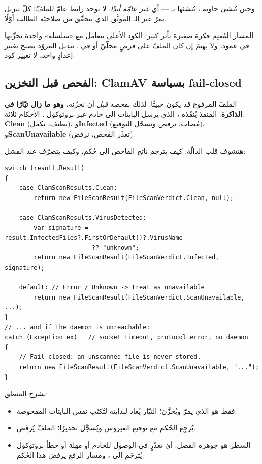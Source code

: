 وحين نُنشئ حاوية ، نُنشئها بـ  — أي \emph{غير
عامّة أبدًا}. لا يوجد رابط عامّ للملفّ؛ كلّ تنزيل يمرّ عبر الـ  الموثَّق الذي
يتحقّق من صلاحيّة الطالب أوّلًا.

\begin{note}
المسار المُعتِم فكرة صغيرة بأثر كبير: الكود الأعلى يتعامل مع «سلسلة» واحدة يخزّنها في
عمود، ولا يهتمّ إن كان الملفّ على قرصٍ محلّيّ أو في . تبديل المزوّد يصبح
تغيير إعدادٍ واحد، لا تغيير كود.
\end{note}

\subsection{الفحص قبل التخزين: ClamAV بسياسة fail-closed}

الملفّ المرفوع قد يكون خبيثًا. لذلك نفحصه \emph{قبل} أن نخزّنه، \textbf{وهو ما زال
تيّارًا في الذاكرة}. المنفذ  يُنفّذه ،
الذي يرسل البايتات إلى خادم  عبر بروتوكول . الأحكام ثلاثة:
\textbf{Clean} (نظيف، نكمل)، و\textbf{Infected} (مُصاب، نرفض ونسجّل التوقيع)،
و\textbf{ScanUnavailable} (تعذّر الفحص، نرفض).

هنشوف قلب الدالّة: كيف يترجم ناتج الفاحص إلى حُكم، وكيف يتصرّف عند الفشل:

\begin{english}
\begin{lstlisting}[language={[Sharp]C}]
switch (result.Result)
{
    case ClamScanResults.Clean:
        return new FileScanResult(FileScanVerdict.Clean, null);

    case ClamScanResults.VirusDetected:
        var signature = result.InfectedFiles?.FirstOrDefault()?.VirusName
                        ?? "unknown";
        return new FileScanResult(FileScanVerdict.Infected, signature);

    default: // Error / Unknown -> treat as unavailable
        return new FileScanResult(FileScanVerdict.ScanUnavailable, ...);
}
// ... and if the daemon is unreachable:
catch (Exception ex)   // socket timeout, protocol error, no daemon
{
    // Fail closed: an unscanned file is never stored.
    return new FileScanResult(FileScanVerdict.ScanUnavailable, "...");
}
\end{lstlisting}
\end{english}

نشرح المنطق:
\begin{itemize}
\item {} فقط هو الذي يمرّ ويُخزَّن؛ التيّار يُعاد لبدايته لتُكتَب نفس
  البايتات المفحوصة.
\item {} يُرجِع الحُكم  مع توقيع الفيروس ويُسجَّل
  تحذيرًا؛ الملفّ يُرفَض.
\item السطر  هو جوهرة الفصل: أيّ تعذّرٍ في الوصول للخادم
  أو مهلة أو خطأ بروتوكول يُترجَم إلى ، ومسار الرفع يرفض هذا
  الحُكم.
\end{itemize}

